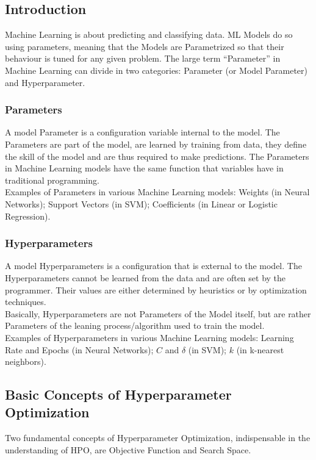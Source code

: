 \subsection{Introduction}

Machine Learning is about predicting and classifying data. ML Models do so using parameters, meaning that the Models are Parametrized so that their behaviour is tuned for any given problem.
The large term “Parameter” in Machine Learning can divide in two categories: Parameter (or Model Parameter) and Hyperparameter.

\subsubsection{Parameters}

A model Parameter is a configuration variable internal to the model.
The Parameters are part of the model, are learned by training from data, they define the skill of the model and are thus required to make predictions.
The Parameters in Machine Learning models have the same function that variables have in traditional programming.
\\[0.3cm]Examples of Parameters in various Machine Learning models: Weights (in Neural Networks); Support Vectors (in SVM); Coefficients (in Linear or Logistic Regression).

\subsubsection{Hyperparameters}

A model Hyperparameters is a configuration that is external to the model.
The Hyperparameters cannot be learned from the data and are often set by the programmer. Their values are either determined by heuristics or by optimization techniques.
\\[0.3cm]Basically, Hyperparameters are not Parameters of the Model itself, but are rather Parameters of the leaning process/algorithm used to train the model.
\\[0.3cm]Examples of Hyperparameters in various Machine Learning models: Learning Rate and Epochs (in Neural Networks); $C$ and $\delta$ (in SVM); $k$ (in k-nearest neighbors).

\subsection{Basic Concepts of Hyperparameter Optimization}

Two fundamental concepts of Hyperparameter Optimization, indispensable in the understanding of HPO, are Objective Function and Search Space.

